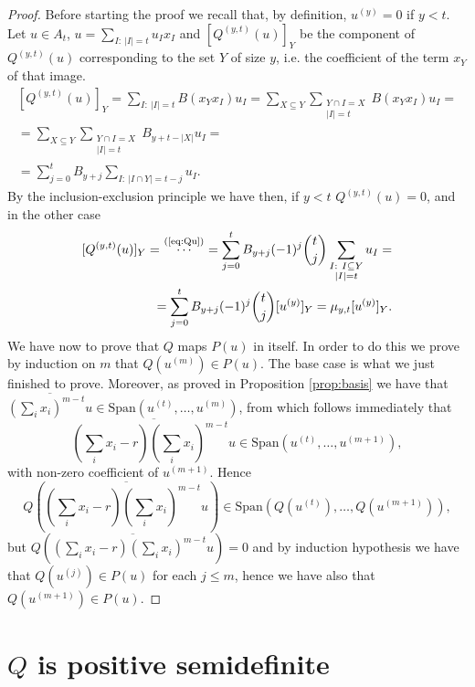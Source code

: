 \documentclass[a4paper,twoside,justified]{tufte-handout}
\begin{document}
\begin{proof}
Before starting the proof we recall that, by definition, $u^{(y)}=0$ if $y<t$. Let $u\in A_t$, $u=\sum_{I:\ |I|=t}u_I x_I$ and $[Q^{(y,t)}(u)]_Y$ be the component of $Q^{(y,t)}(u)$ corresponding to the set $Y$ of size $y$, i.e. the coefficient of the term $x_Y$ of that image.
\begin{equation}\label{eq:Qu}
\begin{split}
[Q^{(y,t)}(u)]_Y
=
\sum_{I:\ |I|=t} B(x_Yx_I)u_I
= 
\sum_{X\subseteq Y}\sum_{\substack{Y \cap I=X \\
|I|=t}}B(x_Yx_I)u_I
=\\
=
\sum_{X\subseteq Y}\sum_{\substack{Y \cap I=X \\
|I|=t}}B_{y+t-|X|}u_I
=\\
=
\sum_{j=0}^tB_{y+j}\sum_{I:\ |I\cap Y|=t-j}u_I.
\end{split}
\end{equation}
By the inclusion-exclusion principle we have then, if $y<t$ $Q^{(y,t)}(u)=0$, and in the other case
\begin{equation*}
\begin{split}
[Q^{(y,t)}(u)]_Y=\ \stackrel{\text{(\ref{eq:Qu})}}{\cdots}\ 
=
\sum_{j=0}^tB_{y+j}(-1)^{j}{t \choose j}\sum_{\substack{I:\ I\subseteq Y\\ |I|=t}}u_I
=\\
=
\sum_{j=0}^tB_{y+j}(-1)^{j}{t \choose j}[u^{(y)}]_Y
=
\mu_{y,t}[u^{(y)}]_Y.
\end{split}
\end{equation*}
We have now to prove that $Q$ maps $P(u)$ in itself. In order to do this we prove by induction on $m$ that $Q(u^{(m)})\in P(u)$. The base case is what we just finished to prove. Moreover, as proved in Proposition \ref{prop:basis} we have that $\overline{(\sum_i x_i)^{m-t}u}\in \mathrm{Span}(u^{(t)},\ldots, u^{(m)})$, from which follows immediately that 
$$
\overline{(\sum_i x_i -r)(\sum_i x_i)^{m-t}u}\in \mathrm{Span}(u^{(t)},\ldots, u^{(m+1)}),
$$
with non-zero coefficient of $u^{(m+1)}$. Hence
$$
Q(\overline{(\sum_i x_i -r)(\sum_i x_i)^{m-t}u})\in \mathrm{Span}(Q(u^{(t)}),\ldots, Q(u^{(m+1)})),
$$
but $Q(\overline{(\sum_i x_i -r)(\sum_i x_i)^{m-t}u})=0$ and by induction hypothesis we have that $Q(u^{(j)})\in P(u)$ for each $j\leq m$, hence we have also that $Q(u^{(m+1)})\in P(u)$.
\end{proof}


\section{$Q$ is positive semidefinite}
\end{document}
